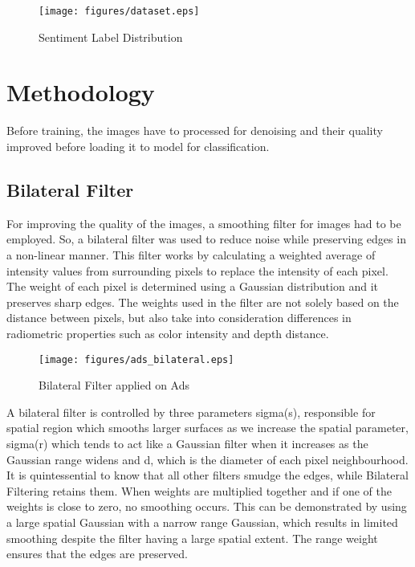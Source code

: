 \documentclass[conference]{IEEEtran}
\begin{document}
\begin{figure}[htbp]
\texttt{[image: figures/dataset.eps]}
\caption{Sentiment Label Distribution}
\label{fig:dataset}
\end{figure}

\section{Methodology} \label{sec:prop_method}

Before training, the images have to processed for denoising and their quality improved before loading it to model for classification. 

\subsection{Bilateral Filter}
For improving the quality of the images, a smoothing filter for images had to be employed. So, a bilateral filter was used to reduce noise while preserving edges in a non-linear manner. This filter works by calculating a weighted average of intensity values from surrounding pixels to replace the intensity of each pixel. The weight of each pixel is determined using a Gaussian distribution and it preserves sharp edges. The weights used in the filter are not solely based on the distance between pixels, but also take into consideration differences in radiometric properties such as color intensity and depth distance\cite{b15}.

\begin{figure}[htp]
\texttt{[image: figures/ads\_bilateral.eps]}
\caption{Bilateral Filter applied on Ads }
\label{fig:ads_bilateral}
\end{figure}

A bilateral filter is controlled by three parameters sigma(s), responsible for spatial region which smooths larger surfaces as we increase the spatial parameter, sigma(r) which tends to act like a Gaussian filter when it increases as the Gaussian range widens and d, which is the diameter of each pixel neighbourhood. It is quintessential to know that all other filters smudge the edges, while Bilateral Filtering retains them. When weights are multiplied together and if one of the weights is close to zero, no smoothing occurs. This can be demonstrated by using a large spatial Gaussian with a narrow range Gaussian, which results in limited smoothing despite the filter having a large spatial extent. The range weight ensures that the edges are preserved.
\end{document}
